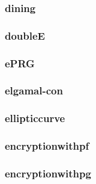 \begin{frame}\frametitle{dining}
\begin{figure}
\begin{center}

\end{center}
\end{figure}
\end{frame}
\begin{frame}\frametitle{doubleE}
\begin{figure}
\begin{center}

\end{center}
\end{figure}
\end{frame}
\begin{frame}\frametitle{ePRG}
\begin{figure}
\begin{center}

\end{center}
\end{figure}
\end{frame}
\begin{frame}\frametitle{elgamal-con}
\begin{figure}
\begin{center}

\end{center}
\end{figure}
\end{frame}
\begin{frame}\frametitle{ellipticcurve}
\begin{figure}
\begin{center}

\end{center}
\end{figure}
\end{frame}
\begin{frame}\frametitle{encryptionwithpf}
\begin{figure}
\begin{center}

\end{center}
\end{figure}
\end{frame}
\begin{frame}\frametitle{encryptionwithpg}
\begin{figure}
\begin{center}

\end{center}
\end{figure}
\end{frame}
